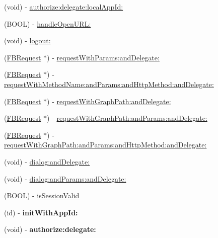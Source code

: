 \begin{DoxyCompactItemize}
\item 
(void) -\/ \hyperlink{interface_facebook_a6f8b7a7d0999024180dcdee71dba1dfe}{authorize\-:delegate\-:local\-App\-Id\-:}
\item 
(\-B\-O\-O\-L) -\/ \hyperlink{interface_facebook_af59e46399f97cdb3f7f235822a30f06f}{handle\-Open\-U\-R\-L\-:}
\item 
(void) -\/ \hyperlink{interface_facebook_a204f10894608b3e10943e15d9861c9be}{logout\-:}
\item 
(\hyperlink{interface_f_b_request}{\-F\-B\-Request} $\ast$) -\/ \hyperlink{interface_facebook_ac0e1ccbcf58473bf050e4b24e9493768}{request\-With\-Params\-:and\-Delegate\-:}
\item 
(\hyperlink{interface_f_b_request}{\-F\-B\-Request} $\ast$) -\/ \hyperlink{interface_facebook_ae8878e3c1cc27a344698cfd2f9b5b083}{request\-With\-Method\-Name\-:and\-Params\-:and\-Http\-Method\-:and\-Delegate\-:}
\item 
(\hyperlink{interface_f_b_request}{\-F\-B\-Request} $\ast$) -\/ \hyperlink{interface_facebook_a3315e8516185b876e85fb42ef5a2d434}{request\-With\-Graph\-Path\-:and\-Delegate\-:}
\item 
(\hyperlink{interface_f_b_request}{\-F\-B\-Request} $\ast$) -\/ \hyperlink{interface_facebook_ac224dc5126a69c4452f7e0fa38c0a138}{request\-With\-Graph\-Path\-:and\-Params\-:and\-Delegate\-:}
\item 
(\hyperlink{interface_f_b_request}{\-F\-B\-Request} $\ast$) -\/ \hyperlink{interface_facebook_a69c9fd4878d826f474e4709cd6e8ab7c}{request\-With\-Graph\-Path\-:and\-Params\-:and\-Http\-Method\-:and\-Delegate\-:}
\item 
(void) -\/ \hyperlink{interface_facebook_afb28ba8c9088bea131e780cbf7a34839}{dialog\-:and\-Delegate\-:}
\item 
(void) -\/ \hyperlink{interface_facebook_a1912857d2083d698ee82dfe17346e6a4}{dialog\-:and\-Params\-:and\-Delegate\-:}
\item 
(\-B\-O\-O\-L) -\/ \hyperlink{interface_facebook_a6178476bc78da9727d4f2b32b9663a9a}{is\-Session\-Valid}
\item 
\hypertarget{interface_facebook_aa85460ff62b6bf81946548b7983b931d}{
(id) -\/ {\bfseries init\-With\-App\-Id\-:}}
\label{interface_facebook_aa85460ff62b6bf81946548b7983b931d}

\item 
\hypertarget{interface_facebook_ae8e4829a8dbf6270c1fa9ee66726560c}{
(void) -\/ {\bfseries authorize\-:delegate\-:}}
\label{interface_facebook_ae8e4829a8dbf6270c1fa9ee66726560c}


\end{DoxyCompactItemize}
